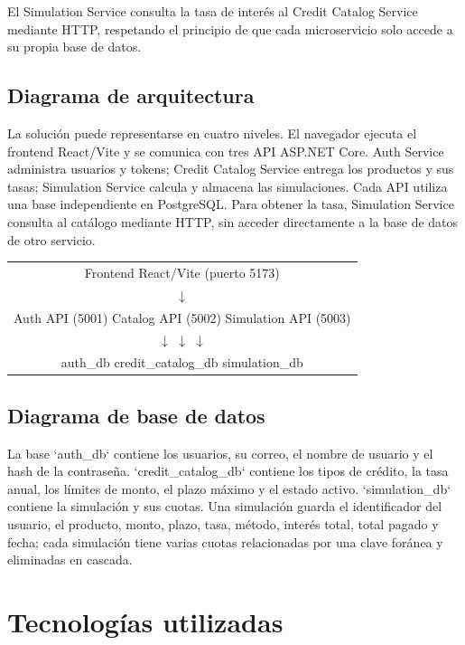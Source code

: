 \documentclass[12pt,a4paper]{article}
\begin{document}
El Simulation Service consulta la tasa de interés al Credit Catalog Service mediante HTTP, respetando el principio de que cada microservicio solo accede a su propia base de datos.

\subsection{Diagrama de arquitectura}

La solución puede representarse en cuatro niveles. El navegador ejecuta el
frontend React/Vite y se comunica con tres API ASP.NET Core. Auth Service
administra usuarios y tokens; Credit Catalog Service entrega los productos y
sus tasas; Simulation Service calcula y almacena las simulaciones. Cada API
utiliza una base independiente en PostgreSQL. Para obtener la tasa, Simulation
Service consulta al catálogo mediante HTTP, sin acceder directamente a la
base de datos de otro servicio.

\begin{center}
\begin{tabular}{c}
Frontend React/Vite (puerto 5173) \\
$\downarrow$ \\
Auth API (5001) \quad Catalog API (5002) \quad Simulation API (5003) \\
$\downarrow$ \qquad\qquad $\downarrow$ \qquad\qquad $\downarrow$ \\
auth\_db \qquad credit\_catalog\_db \qquad simulation\_db
\end{tabular}
\end{center}

\subsection{Diagrama de base de datos}

La base `auth\_db` contiene los usuarios, su correo, el nombre de usuario y
el hash de la contraseña. `credit\_catalog\_db` contiene los tipos de crédito,
la tasa anual, los límites de monto, el plazo máximo y el estado activo.
`simulation\_db` contiene la simulación y sus cuotas. Una simulación guarda el
identificador del usuario, el producto, monto, plazo, tasa, método, interés
total, total pagado y fecha; cada simulación tiene varias cuotas relacionadas
por una clave foránea y eliminadas en cascada.

\section{Tecnologías utilizadas}
\end{document}
